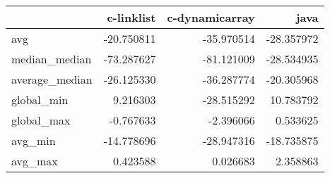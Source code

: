 \begin{tabular}{lrrr}
\toprule
{} &  c-linklist &  c-dynamicarray &       java \\
\midrule
avg            &  -20.750811 &      -35.970514 & -28.357972 \\
median\_median  &  -73.287627 &      -81.121009 & -28.534935 \\
average\_median &  -26.125330 &      -36.287774 & -20.305968 \\
global\_min     &    9.216303 &      -28.515292 &  10.783792 \\
global\_max     &   -0.767633 &       -2.396066 &   0.533625 \\
avg\_min        &  -14.778696 &      -28.947316 & -18.735875 \\
avg\_max        &    0.423588 &        0.026683 &   2.358863 \\
\bottomrule
\end{tabular}
